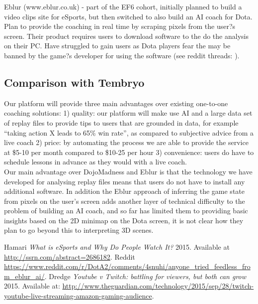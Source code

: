 \documentclass[12pt]{report} %
\begin{document}
Eblur (www.eblur.co.uk) - part of the EF6 cohort, initially planned to build a video clips site for eSports, but then switched to also build an AI coach for Dota. Plan to provide the coaching in real time by scraping pixels from the user?s screen. Their product requires users to download software to the do the analysis on their PC. Have struggled to gain users as Dota players fear the may be banned by the game?s developer for using the software (see reddit threads: \cite{Eblur}).

\subsection{Comparison with Tembryo}
 
Our platform will provide three main advantages over existing one-to-one coaching solutions: 1) quality: our platform will make use AI and a large data set of replay files to provide tips to users that are grounded in data, for example ``taking action X leads to 65\% win rate'', as compared to subjective advice from a live coach 2) price: by automating the process we are able to provide the service at \$5-10 per month compared to \$10-25 per hour 3) convenience: users do have to schedule lessons in advance as they would with a live coach.\\ 

Our main advantage over DojoMadness and Eblur is that the technology we have developed for analysing replay files means that users do not have to install any additional software. In addition the Eblur approach of inferring the game state from pixels on the user's screen adds another layer of technical difficulty to the problem of building an AI coach, and so far has limited them to providing basic insights based on the 2D minimap on the Dota screen, it is not clear how they plan to go beyond this to interpreting 3D scenes. 

\begin{thebibliography}{10}

  Hamari  {\em What is eSports and Why Do People Watch It?} 2015. Available at \url{http://ssrn.com/abstract=2686182}.
 Reddit \url{https://www.reddit.com/r/DotA2/comments/4snuhi/anyone_tried_feedless_from_eblur_ai/}.
 Dredge  {\em Youtube v Twitch: battling for viewers, but both can grow}  2015. Available at: \url{http://www.theguardian.com/technology/2015/sep/28/twitch-youtube-live-streaming-amazon-gaming-audience}.

\end{thebibliography}
\end{document}
